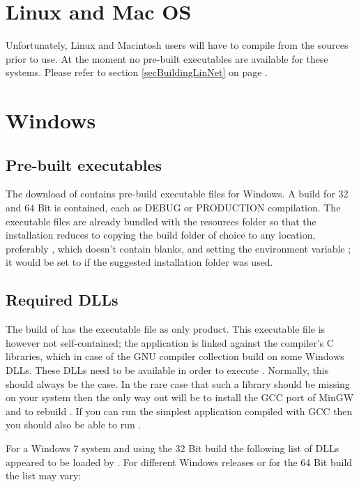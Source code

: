 \section{Linux and Mac OS}

Unfortunately, Linux and Macintosh users will have to compile \linnet{}
from the sources prior to use. At the moment no pre-built executables are
available for these systems. Please refer to section
\ref{secBuildingLinNet} on page \pageref{secBuildingLinNet}.


\section{Windows}

\subsection{Pre-built executables}

The download of \linnet{} contains pre-build executable files for Windows.
A build for 32 and 64 Bit is contained, each as DEBUG or PRODUCTION
compilation. The executable files are already bundled with the resources
folder  so that the installation reduces to copying the
build folder of choice to any location, preferably
, which doesn't contain blanks, and setting
the environment variable ; it would be set to
 if the suggested
installation folder was used.


\subsection{Required DLLs}

The build of \linnet{} has the executable file  as only
product. This executable file is however not self-contained; the
application is linked against the compiler's C libraries, which in case of
the GNU compiler collection build on some Windows DLLs. These DLLs need to
be available in order to execute \linnet{}. Normally, this should always
be the case. In the rare case that such a library should be missing on
your system then the only way out will be to install the GCC port of MinGW
and to rebuild \linnet{}. If you can run the simplest 
application compiled with GCC then you should also be able to run
\linnet{}.

For a Windows 7 system and using the 32 Bit build the following list of
DLLs appeared to be loaded by \linnet{}. For different Windows releases or
for the 64 Bit build the list may vary:

